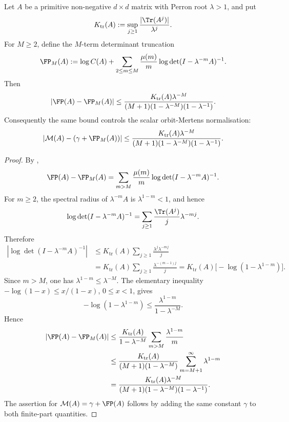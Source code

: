 \begin{theorem}
  \label{thm:logM-truncation-bound}
  Let \(A\) be a primitive non-negative \(d\times d\) matrix with Perron root
  \(\lambda>1\), and put
  \[
    K_{\mathrm{tr}}(A):=
    \sup_{j\ge1}\frac{|\Tr(A^j)|}{\lambda^j}.
  \]
  For \(M\ge2\), define the \(M\)-term determinant truncation
  \[
    \FP_M(A):=
    \log C(A)+\sum_{2\le m\le M}\frac{\mu(m)}{m}
      \log\det(I-\lambda^{-m}A)^{-1}.
  \]
  Then
  \[
    |\FP(A)-\FP_M(A)|
    \le
    \frac{K_{\mathrm{tr}}(A)\lambda^{-M}}
      {(M+1)(1-\lambda^{-M})(1-\lambda^{-1})}.
  \]
  Consequently the same bound controls the scalar orbit-Mertens
  normalisation:
  \[
    |\mathcal M(A)-(\gamma+\FP_M(A))|
    \le
    \frac{K_{\mathrm{tr}}(A)\lambda^{-M}}
      {(M+1)(1-\lambda^{-M})(1-\lambda^{-1})}.
  \]
\end{theorem}

\begin{proof}
  By ,
  \[
    \FP(A)-\FP_M(A)
    =
    \sum_{m>M}\frac{\mu(m)}{m}
      \log\det(I-\lambda^{-m}A)^{-1}.
  \]
  For \(m\ge2\), the spectral radius of \(\lambda^{-m}A\) is
  \(\lambda^{1-m}<1\), and hence
  \[
    \log\det(I-\lambda^{-m}A)^{-1}
    =
    \sum_{j\ge1}\frac{\Tr(A^j)}{j}\lambda^{-mj}.
  \]
  Therefore
  \[
  \begin{aligned}
    \left|
      \log\det(I-\lambda^{-m}A)^{-1}
    \right|
    &\le
    K_{\mathrm{tr}}(A)
      \sum_{j\ge1}\frac{\lambda^j\lambda^{-mj}}{j}  \\
    &=
    K_{\mathrm{tr}}(A)
      \sum_{j\ge1}\frac{\lambda^{-(m-1)j}}{j}
    =
    K_{\mathrm{tr}}(A)\bigl[-\log(1-\lambda^{1-m})\bigr].
  \end{aligned}
  \]
  Since \(m>M\), one has \(\lambda^{1-m}\le\lambda^{-M}\).  The elementary
  inequality \(-\log(1-x)\le x/(1-x)\), \(0\le x<1\), gives
  \[
    -\log(1-\lambda^{1-m})
    \le
    \frac{\lambda^{1-m}}{1-\lambda^{-M}}.
  \]
  Hence
  \[
  \begin{aligned}
    |\FP(A)-\FP_M(A)|
    &\le
    \frac{K_{\mathrm{tr}}(A)}{1-\lambda^{-M}}
      \sum_{m>M}\frac{\lambda^{1-m}}{m} \\
    &\le
    \frac{K_{\mathrm{tr}}(A)}{(M+1)(1-\lambda^{-M})}
      \sum_{m=M+1}^{\infty}\lambda^{1-m}  \\
    &=
    \frac{K_{\mathrm{tr}}(A)\lambda^{-M}}
      {(M+1)(1-\lambda^{-M})(1-\lambda^{-1})}.
  \end{aligned}
  \]
  The assertion for \(\mathcal M(A)=\gamma+\FP(A)\) follows by adding the same
  constant \(\gamma\) to both finite-part quantities.
\end{proof}

